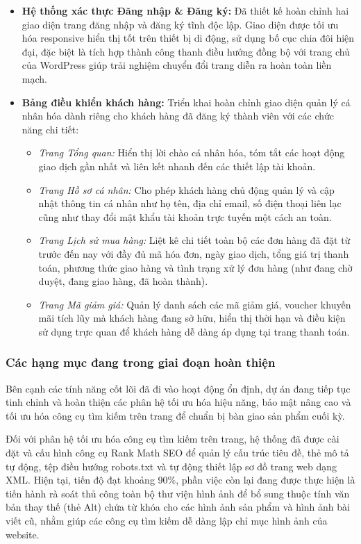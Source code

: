 \begin{itemize}
    \item \textbf{Hệ thống xác thực Đăng nhập \& Đăng ký:} Đã thiết kế hoàn chỉnh hai giao diện trang đăng nhập và đăng ký tĩnh độc lập. Giao diện được tối ưu hóa responsive hiển thị tốt trên thiết bị di động, sử dụng bố cục chia đôi hiện đại, đặc biệt là tích hợp thành công thanh điều hướng đồng bộ với trang chủ của WordPress giúp trải nghiệm chuyển đổi trang diễn ra hoàn toàn liền mạch.
    \item \textbf{Bảng điều khiển khách hàng:} Triển khai hoàn chỉnh giao diện quản lý cá nhân hóa dành riêng cho khách hàng đã đăng ký thành viên với các chức năng chi tiết:
    \begin{itemize}
        \item \textit{Trang Tổng quan:} Hiển thị lời chào cá nhân hóa, tóm tắt các hoạt động giao dịch gần nhất và liên kết nhanh đến các thiết lập tài khoản.
        \item \textit{Trang Hồ sơ cá nhân:} Cho phép khách hàng chủ động quản lý và cập nhật thông tin cá nhân như họ tên, địa chỉ email, số điện thoại liên lạc cũng như thay đổi mật khẩu tài khoản trực tuyến một cách an toàn.
        \item \textit{Trang Lịch sử mua hàng:} Liệt kê chi tiết toàn bộ các đơn hàng đã đặt từ trước đến nay với đầy đủ mã hóa đơn, ngày giao dịch, tổng giá trị thanh toán, phương thức giao hàng và tình trạng xử lý đơn hàng (như đang chờ duyệt, đang giao hàng, đã hoàn thành).
        \item \textit{Trang Mã giảm giá:} Quản lý danh sách các mã giảm giá, voucher khuyến mãi tích lũy mà khách hàng đang sở hữu, hiển thị thời hạn và điều kiện sử dụng trực quan để khách hàng dễ dàng áp dụng tại trang thanh toán.
    \end{itemize}
\end{itemize}

\subsubsection{Các hạng mục đang trong giai đoạn hoàn thiện}

Bên cạnh các tính năng cốt lõi đã đi vào hoạt động ổn định, dự án đang tiếp tục tinh chỉnh và hoàn thiện các phân hệ tối ưu hóa hiệu năng, bảo mật nâng cao và tối ưu hóa công cụ tìm kiếm trên trang để chuẩn bị bàn giao sản phẩm cuối kỳ.

Đối với phân hệ tối ưu hóa công cụ tìm kiếm trên trang, hệ thống đã được cài đặt và cấu hình công cụ Rank Math SEO \cite{plugin_rankmath,google_seo_guide} để quản lý cấu trúc tiêu đề, thẻ mô tả tự động, tệp điều hướng robots.txt và tự động thiết lập sơ đồ trang web dạng XML. Hiện tại, tiến độ đạt khoảng 90\%, phần việc còn lại đang được thực hiện là tiến hành rà soát thủ công toàn bộ thư viện hình ảnh để bổ sung thuộc tính văn bản thay thế (thẻ Alt) chứa từ khóa cho các hình ảnh sản phẩm và hình ảnh bài viết cũ, nhằm giúp các công cụ tìm kiếm dễ dàng lập chỉ mục hình ảnh của website.

